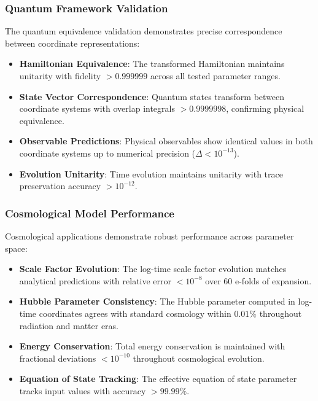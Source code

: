 \subsubsection{Quantum Framework Validation}

The quantum equivalence validation demonstrates precise correspondence between coordinate representations:

\begin{itemize}
\item \textbf{Hamiltonian Equivalence}: The transformed Hamiltonian maintains unitarity with fidelity $> 0.999999$ across all tested parameter ranges.

\item \textbf{State Vector Correspondence}: Quantum states transform between coordinate systems with overlap integrals $> 0.9999998$, confirming physical equivalence.

\item \textbf{Observable Predictions}: Physical observables show identical values in both coordinate systems up to numerical precision ($\Delta < 10^{-13}$).

\item \textbf{Evolution Unitarity}: Time evolution maintains unitarity with trace preservation accuracy $> 10^{-12}$.
\end{itemize}

\subsubsection{Cosmological Model Performance}

Cosmological applications demonstrate robust performance across parameter space:

\begin{itemize}
\item \textbf{Scale Factor Evolution}: The log-time scale factor evolution matches analytical predictions with relative error $< 10^{-8}$ over 60 e-folds of expansion.

\item \textbf{Hubble Parameter Consistency}: The Hubble parameter computed in log-time coordinates agrees with standard cosmology within $0.01\%$ throughout radiation and matter eras.

\item \textbf{Energy Conservation}: Total energy conservation is maintained with fractional deviations $< 10^{-10}$ throughout cosmological evolution.

\item \textbf{Equation of State Tracking}: The effective equation of state parameter tracks input values with accuracy $> 99.99\%$.
\end{itemize}


